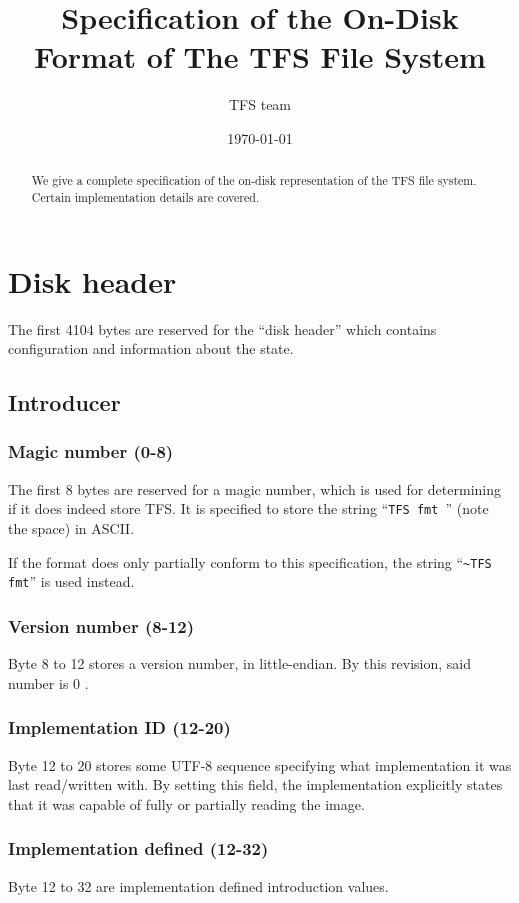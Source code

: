 \documentclass[11pt,a4paper]{report}
\title{Specification of the On-Disk Format of The TFS File System}
\author{TFS team}
\date{\today}
\newcommand{\versionnumber}{0 }
\newcommand{\clustersize}{4104 }
\begin{document}
    \maketitle
    \begin{abstract}
        We give a complete specification of the on-disk representation of the
        TFS file system. Certain implementation details are covered.
    \end{abstract}

    \chapter{Disk header}
    The first \clustersize bytes are reserved for the ``disk header'' which
    contains configuration and information about the state.

    \section{Introducer}
        \subsection{Magic number (0-8)}
        The first 8 bytes are reserved for a magic number, which is used for
        determining if it does indeed store TFS. It is specified to store the
        string ``\texttt{TFS fmt }'' (note the space) in ASCII.

        If the format does only partially conform to this specification, the
        string ``\texttt{\textasciitilde TFS fmt}'' is used instead.

        \subsection{Version number (8-12)}
        Byte 8 to 12 stores a version number, in little-endian. By this
        revision, said number is \versionnumber.

        \subsection{Implementation ID (12-20)}
        Byte 12 to 20 stores some UTF-8 sequence specifying what implementation
        it was last read/written with. By setting this field, the
        implementation explicitly states that it was capable of fully or
        partially reading the image.

        \subsection{Implementation defined (12-32)}
        Byte 12 to 32 are implementation defined introduction values.
\end{document}
